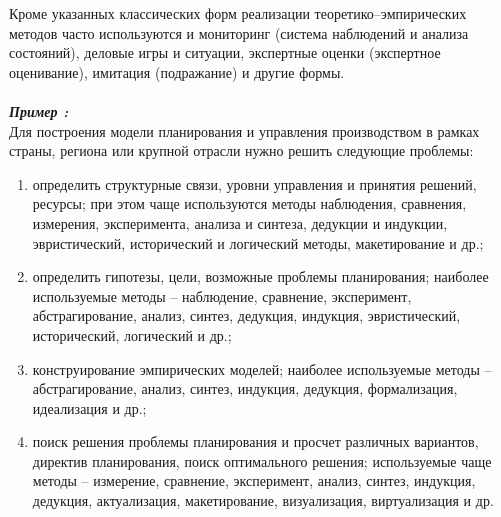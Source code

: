 Кроме указанных классических форм реализации теоретико--эмпирических методов часто используются и мониторинг (система наблюдений и анализа состояний), деловые игры и ситуации, экспертные оценки (экспертное оценивание), имитация (подражание) и другие формы.\\
\\\emph{\textbf{Пример :}}
\\Для построения модели планирования и управления производством в рамках страны, региона или крупной отрасли нужно решить следующие проблемы:
\begin{enumerate}
\item определить структурные связи, уровни управления и принятия решений, ресурсы; при этом чаще используются методы наблюдения, сравнения, измерения, эксперимента, анализа и синтеза, дедукции и индукции, эвристический, исторический и логический методы, макетирование и др.;
\item определить гипотезы, цели, возможные проблемы планирования; наиболее используемые методы – наблюдение, сравнение, эксперимент, абстрагирование, анализ, синтез, дедукция, индукция, эвристический, исторический, логический и др.;
\item конструирование эмпирических моделей; наиболее используемые методы – абстрагирование, анализ, синтез, индукция, дедукция, формализация, идеализация и др.;
\item поиск решения проблемы планирования и просчет различных вариантов, директив планирования, поиск оптимального решения; используемые чаще методы – измерение, сравнение, эксперимент, анализ, синтез, индукция, дедукция, актуализация, макетирование, визуализация, виртуализация и др.
\end{enumerate}